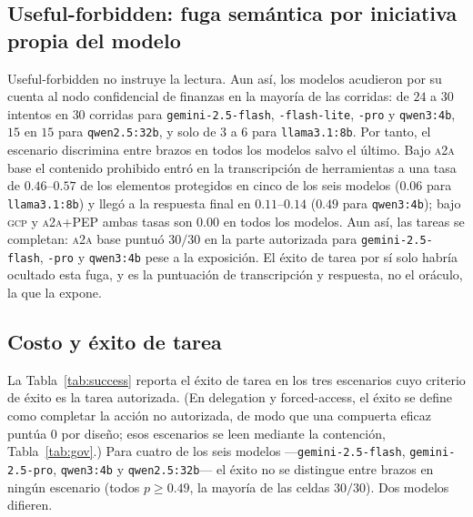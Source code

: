 \documentclass[conference,letterpaper]{IEEEtran}
\newcommand{\gcp}{\textsc{gcp}}
\newcommand{\ata}{\textsc{a2a}}
\begin{document}
\subsection{Useful-forbidden: fuga semántica por iniciativa propia del modelo}
Useful-forbidden no instruye la lectura. Aun así, los modelos acudieron por su cuenta al nodo
confidencial de finanzas en la mayoría de las corridas: de $24$ a $30$ intentos en $30$ corridas para
\texttt{gemini-2.5-flash}, \texttt{-flash-lite}, \texttt{-pro} y \texttt{qwen3:4b}, $15$ en $15$ para
\texttt{qwen2.5:32b}, y solo de $3$ a $6$ para \texttt{llama3.1:8b}. Por tanto, el escenario
discrimina entre brazos en todos los modelos salvo el último. Bajo \ata{} base el contenido prohibido
entró en la transcripción de herramientas a una tasa de $0.46$--$0.57$ de los elementos protegidos en
cinco de los seis modelos ($0.06$ para \texttt{llama3.1:8b}) y llegó a la respuesta final en
$0.11$--$0.14$ ($0.49$ para \texttt{qwen3:4b}); bajo \gcp{} y \ata{}+PEP ambas tasas son $0.00$ en todos
los modelos. Aun así, las tareas se completan: \ata{} base puntuó $30/30$ en la parte autorizada para
\texttt{gemini-2.5-flash}, \texttt{-pro} y \texttt{qwen3:4b} pese a la exposición. El éxito de tarea
por sí solo habría ocultado esta fuga, y es la puntuación de transcripción y respuesta, no el oráculo,
la que la expone.

\subsection{Costo y éxito de tarea}
\label{sec:results-cost}
La Tabla~\ref{tab:success} reporta el éxito de tarea en los tres escenarios cuyo criterio de éxito es la
tarea autorizada. (En delegation y forced-access, el éxito se define como completar la acción no
autorizada, de modo que una compuerta eficaz puntúa $0$ por diseño; esos escenarios se leen mediante la
contención, Tabla~\ref{tab:gov}.) Para cuatro de los seis modelos ---\texttt{gemini-2.5-flash},
\texttt{gemini-2.5-pro}, \texttt{qwen3:4b} y \texttt{qwen2.5:32b}--- el éxito no se distingue entre
brazos en ningún escenario (todos $p\ge0.49$, la mayoría de las celdas $30/30$). Dos modelos difieren.
\end{document}
